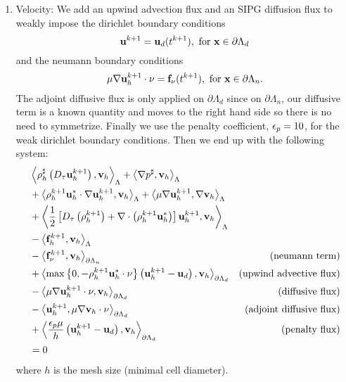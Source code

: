 \documentclass[letterpaper]{erdc}
\begin{document}
\begin{enumerate}
\item Velocity:
We add an upwind advection flux and an SIPG diffusion flux to weakly impose the dirichlet boundary conditions
\begin{equation}
  \textbf{u}^{k+1} = \textbf{u}_d(t^{k+1}),  \mbox{ for } \textbf{x} \in \partial\Lambda_d
\end{equation}
and the neumann boundary conditions
\begin{equation}
  \mu\nabla\textbf{u}^{k+1}_h\cdot\nu = \mathbf{f}_{\nu}(t^{k+1}),  \mbox{ for } \textbf{x} \in \partial\Lambda_n.
\end{equation}
  The adjoint diffusive flux is only applied on $\partial\Lambda_d$ since on $\partial\Lambda_n$, our diffusive term is a known quantity and moves to the right hand side so there is no need to symmetrize.  Finally we use the penalty coefficient, $\epsilon_p = 10$, for the weak dirichlet boundary conditions.  Then we end up with the following system:
\begin{align*}
  &\left\langle  \rho^{\sharp}_h\left(D_{\tau}\textbf{u}_h^{k+1}\right),  \textbf{v}_h  \right\rangle_{\Lambda} + \left\langle  \nabla p^{\sharp},  \textbf{v}_h  \right\rangle_{\Lambda} &\\
   &+ \left\langle  \rho^{k+1}_h \textbf{u}^{*}_h\cdot\nabla \textbf{u}^{k+1}_h,  \textbf{v}_h  \right\rangle_{\Lambda} + \left\langle  \mu \nabla \textbf{u}^{k+1}_h,  \nabla \textbf{v}_h  \right\rangle_{\Lambda} &\\
   &+ \left\langle  \frac{1}{2}\left[ D_{\tau}\left(\rho_h^{k+1}\right) + \nabla\cdot\left( \rho_h^{k+1}\textbf{u}_h^{*} \right)\right] \textbf{u}_h^{k+1},  \textbf{v}_h  \right\rangle_{\Lambda} &\\
   &- \left\langle  \mathbf{f}^{k+1}_h ,  \textbf{v}_h  \right\rangle_{\Lambda} &\\
   &- \left\langle  \mathbf{f}^{k+1}_{\nu},  \textbf{v}_h  \right\rangle_{\partial\Lambda_n}                                                   &\mbox{(neumann term)}\\
   &+ \left\langle  \max\left\{0, -\rho^{k+1}_h \textbf{u}^{*}_h\cdot\nu\right\} \left(\textbf{u}^{k+1}_h - \textbf{u}_d\right),  \textbf{v}_h  \right\rangle_{\partial\Lambda_d}     &\mbox{(upwind advective flux)}\\
   &- \left\langle  \mu \nabla \textbf{u}^{k+1}_h\cdot\nu,  \textbf{v}_h  \right\rangle_{\partial\Lambda_d}                          &\mbox{(diffusive flux)}\\
   &- \left\langle  \textbf{u}^{k+1}_h,  \mu \nabla \textbf{v}_h\cdot\nu  \right\rangle_{\partial\Lambda_d}                          &\mbox{(adjoint diffusive flux)}\\
   &+ \left\langle  \frac{\epsilon_p\mu}{h} \left(\textbf{u}^{k+1}_h - \textbf{u}_d\right),  \textbf{v}_h  \right\rangle_{\partial\Lambda_d}                     &\mbox{(penalty flux)}\\
   & = 0&
\end{align*}
where $h$ is the mesh size (minimal cell diameter).


\end{enumerate}
\end{document}
